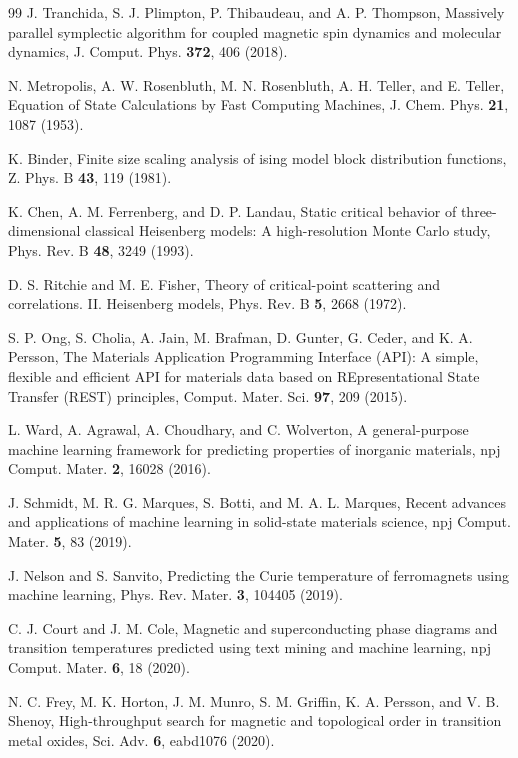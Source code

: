 \documentclass[aps,prb,preprint,superscriptaddress,longbibliography,nofootinbib]{revtex4-2}
\begin{document}
\begin{thebibliography}{99}
 J. Tranchida, S. J. Plimpton, P. Thibaudeau, and A. P. Thompson, Massively parallel
symplectic algorithm for coupled magnetic spin dynamics and molecular dynamics, J. Comput. Phys.
\textbf{372}, 406 (2018).

 N. Metropolis, A. W. Rosenbluth, M. N. Rosenbluth, A. H. Teller, and E. Teller, Equation of State Calculations by Fast Computing Machines, J. Chem. Phys. \textbf{21}, 1087 (1953).

 K. Binder, Finite size scaling analysis of ising model block distribution functions, Z. Phys. B \textbf{43}, 119 (1981).

 K. Chen, A. M. Ferrenberg, and D. P. Landau, Static critical behavior of
three-dimensional classical Heisenberg models: A high-resolution Monte Carlo study, Phys. Rev. B
\textbf{48}, 3249 (1993).

 D. S. Ritchie and M. E. Fisher, Theory of critical-point scattering and correlations. II.
Heisenberg models, Phys. Rev. B \textbf{5}, 2668 (1972).

 S. P. Ong, S. Cholia, A. Jain, M. Brafman, D. Gunter, G. Ceder, and K. A. Persson, The Materials Application Programming Interface (API): A simple, flexible and efficient API for materials data based on REpresentational State Transfer (REST) principles, Comput. Mater. Sci. \textbf{97}, 209 (2015).

 L. Ward, A. Agrawal, A. Choudhary, and C. Wolverton, A general-purpose machine learning framework for predicting properties of inorganic materials, npj Comput. Mater. \textbf{2}, 16028 (2016).

 J. Schmidt, M. R. G. Marques, S. Botti, and M. A. L. Marques, Recent advances and applications of machine learning in solid-state materials science, npj Comput. Mater. \textbf{5}, 83 (2019).

 J. Nelson and S. Sanvito, Predicting the Curie temperature of ferromagnets using machine learning, Phys. Rev. Mater. \textbf{3}, 104405 (2019).

 C. J. Court and J. M. Cole, Magnetic and superconducting phase diagrams and transition temperatures predicted using text mining and machine learning, npj Comput. Mater. \textbf{6}, 18 (2020).

 N. C. Frey, M. K. Horton, J. M. Munro, S. M. Griffin, K. A. Persson, and V. B. Shenoy, High-throughput search for magnetic and topological order in transition metal oxides, Sci. Adv. \textbf{6}, eabd1076 (2020).


\end{thebibliography}
\end{document}
